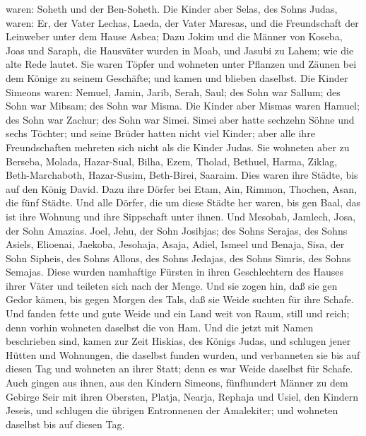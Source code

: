 waren: Soheth und der Ben-Soheth.  Die Kinder aber Selas,
des Sohns Judas, waren: Er, der Vater Lechas, Laeda, der Vater Maresas,
und die Freundschaft der Leinweber unter dem Hause Asbea; 
Dazu Jokim und die Männer von Koseba, Joas und Saraph, die Hausväter
wurden in Moab, und Jasubi zu Lahem; wie die alte Rede lautet.
 Sie waren Töpfer und wohneten unter Pflanzen und Zäunen
bei dem Könige zu seinem Geschäfte; und kamen und blieben daselbst.
 Die Kinder Simeons waren: Nemuel, Jamin, Jarib, Serah,
Saul;  des Sohn war Sallum; des Sohn war Mibsam; des Sohn
war Misma.  Die Kinder aber Mismas waren Hamuel; des Sohn
war Zachur; des Sohn war Simei.  Simei aber hatte sechzehn
Söhne und sechs Töchter; und seine Brüder hatten nicht viel Kinder; aber
alle ihre Freundschaften mehreten sich nicht als die Kinder Judas.
 Sie wohneten aber zu Berseba, Molada, Hazar-Sual,
 Bilha, Ezem, Tholad,  Bethuel, Harma, Ziklag,
 Beth-Marchaboth, Hazar-Susim, Beth-Birei, Saaraim. Dies
waren ihre Städte, bis auf den König David.  Dazu ihre
Dörfer bei Etam, Ain, Rimmon, Thochen, Asan, die fünf Städte.
 Und alle Dörfer, die um diese Städte her waren, bis gen
Baal, das ist ihre Wohnung und ihre Sippschaft unter ihnen.
 Und Mesobab, Jamlech, Josa, der Sohn Amazias.
 Joel, Jehu, der Sohn Josibjas; des Sohns Serajas, des
Sohns Asiels,  Elioenai, Jaekoba, Jesohaja, Asaja, Adiel,
Ismeel und Benaja,  Sisa, der Sohn Sipheis, des Sohns
Allons, des Sohns Jedajas, des Sohns Simris, des Sohns Semajas.
 Diese wurden namhaftige Fürsten in ihren Geschlechtern des
Hauses ihrer Väter und teileten sich nach der Menge.  Und
sie zogen hin, daß sie gen Gedor kämen, bis gegen Morgen des Tals, daß
sie Weide suchten für ihre Schafe.  Und fanden fette und
gute Weide und ein Land weit von Raum, still und reich; denn vorhin
wohneten daselbst die von Ham.  Und die jetzt mit Namen
beschrieben sind, kamen zur Zeit Hiskias, des Königs Judas, und schlugen
jener Hütten und Wohnungen, die daselbst funden wurden, und verbanneten
sie bis auf diesen Tag und wohneten an ihrer Statt; denn es war Weide
daselbst für Schafe.  Auch gingen aus ihnen, aus den
Kindern Simeons, fünfhundert Männer zu dem Gebirge Seir mit ihren
Obersten, Platja, Nearja, Rephaja und Usiel, den Kindern Jeseis,
 und schlugen die übrigen Entronnenen der Amalekiter; und
wohneten daselbst bis auf diesen Tag.

